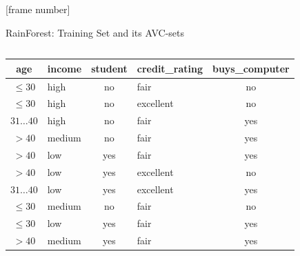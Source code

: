 \documentclass[aspectratio=169,t,table]{beamer}
\begin{document}
  {
    [frame number]
    \begin{frame}{RainForest: Training Set and its AVC-sets}
      \begin{columns}
        \begin{column}{0.6\textwidth}
          \begin{tabular}{|c|l|c|l|c|}
            \hline
            \cellcolor{blue!20}age & \cellcolor{blue!20}income & \cellcolor{blue!20}student & \cellcolor{blue!20}credit\_rating & \cellcolor{brown!20}buys\_computer \\\hline
            \cellcolor{yellow!20}$\leq30$ & \cellcolor{yellow!20}high & \cellcolor{yellow!20}no & \cellcolor{yellow!20}fair & \cellcolor{red!20}no \\\hline
            \cellcolor{yellow!20}$\leq30$ & \cellcolor{yellow!20}high & \cellcolor{yellow!20}no & \cellcolor{yellow!20}excellent & \cellcolor{red!20}no \\\hline
            \cellcolor{yellow!20}$31\ldots40$ & \cellcolor{yellow!20}high & \cellcolor{yellow!20}no & \cellcolor{yellow!20}fair & \cellcolor{green!20}yes \\\hline
            \cellcolor{yellow!20}$>40$ & \cellcolor{yellow!20}medium & \cellcolor{yellow!20}no & \cellcolor{yellow!20}fair & \cellcolor{green!20}yes \\\hline
            \cellcolor{yellow!20}$>40$ & \cellcolor{yellow!20}low & \cellcolor{yellow!20}yes & \cellcolor{yellow!20}fair & \cellcolor{green!20}yes \\\hline
            \cellcolor{yellow!20}$>40$ & \cellcolor{yellow!20}low & \cellcolor{yellow!20}yes & \cellcolor{yellow!20}excellent & \cellcolor{red!20}no \\\hline
            \cellcolor{yellow!20}$31\ldots40$ & \cellcolor{yellow!20}low & \cellcolor{yellow!20}yes & \cellcolor{yellow!20}excellent & \cellcolor{green!20}yes \\\hline
            \cellcolor{yellow!20}$\leq30$ & \cellcolor{yellow!20}medium & \cellcolor{yellow!20}no & \cellcolor{yellow!20}fair & \cellcolor{red!20}no \\\hline
            \cellcolor{yellow!20}$\leq30$ & \cellcolor{yellow!20}low & \cellcolor{yellow!20}yes & \cellcolor{yellow!20}fair & \cellcolor{green!20}yes \\\hline
            \cellcolor{yellow!20}$>40$ & \cellcolor{yellow!20}medium & \cellcolor{yellow!20}yes & \cellcolor{yellow!20}fair & \cellcolor{green!20}yes \\\hline

\end{tabular}
\end{column}
\end{columns}
\end{frame}}
\end{document}
